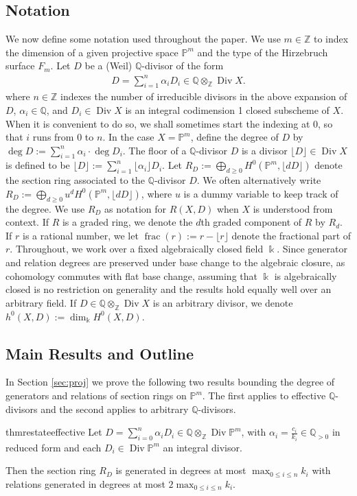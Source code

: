 \documentclass{amsart}
\theoremstyle{plain}
\theoremstyle{definition}
\theoremstyle{remark}
\numberwithin{equation}{subsection}
\newcommand\ssec{\subsection}
\newcommand\bq{{\mathbb Q}}
\newcommand\bp{{\mathbb P}}
\newcommand\bz{{\mathbb Z}}
\newcommand\bk{{\Bbbk}}
\DeclareMathOperator\di{Div}
\newcommand\hirz{F}
\DeclareMathOperator{\fr}{frac}
\begin{document}
\subsection{Notation}
We now define some notation used throughout the paper.
We use $m \in \bz$ to index the dimension of a given projective
space $\bp^m$ and the type of the Hirzebruch surface $\hirz_m$.
Let $D$ be a (Weil) $\bq$-divisor of the form
\begin{align*}
	D = \sum_{i=1}^{n}\alpha_i D_i \in \bq \otimes_\bz \di X.
\end{align*}\noindent
where $n \in \bz$ indexes the number of irreducible divisors in 
the above expansion of $D$, $\alpha_i \in \bq$, and $D_i \in \di X$ is an integral
codimension 1 closed subscheme of $X$. When it is convenient to do
so, we shall sometimes start the indexing at $0$, so that $i$ runs
from $0$ to $n$. In the case $X = \bp^m$, define the degree of $D$ by $\deg D :=
\sum_{i=1}^{n}\alpha_i \cdot \deg D_i$. The floor of a $\bq$-divisor $D$ is a divisor $\lfloor D
\rfloor \in \di X$ is defined to be $\lfloor D \rfloor := \sum_{i = 1}^{n}
\lfloor \alpha_i \rfloor D_i$. Let 
$R_D := \bigoplus_{d \geq 0} H^0(\bp^m, \lfloor dD \rfloor)$
denote the section ring associated to the $\bq$-divisor $D$. 
We often alternatively write
$R_D := \bigoplus_{d \geq 0} u^d H^0(\bp^m, \lfloor dD \rfloor)$, where $u$ is a dummy
variable to keep track of the degree.
We use $R_D$ as notation for $R(X,D)$ when $X$ is understood from context.
If $R$
is a graded ring, we denote the $d$th graded component of $R$ by $R_d$. If $r$ is a rational number, we let
$\fr(r) := r - \lfloor r
\rfloor$ denote the fractional part of $r$. 
Throughout, we work over a fixed algebraically closed field $\bk$.
Since generator and relation degrees are preserved under base change to the algebraic closure, 
as cohomology commutes with flat base change,
assuming that $\bk$ is algebraically closed is no restriction
on generality and the results hold equally well over an arbitrary field.
If $D \in \bq \otimes_\bz
\di X$ is an arbitrary divisor, we denote $h^0(X, D) := \dim_\bk H^0(X,D)$.

\ssec{Main Results and Outline}
\label{ssec:main}

In Section \ref{sec:proj} we prove the following two results bounding
the degree of generators and relations of
section rings on $\bp^m$. The first applies
to effective $\bq$-divisors and the second applies to arbitrary
$\bq$-divisors.
\begin{restatable}{thm}{restateeffective}
\label{thm:proj-effective-intro}
Let $D = \sum_{i = 0}^{n} \alpha_i D_i \in \bq \otimes_\bz \di \bp^m$, with $\alpha_i =
\frac{c_i}{k_i} \in \bq_{> 0}$ in reduced form and each $D_i \in \di \bp^m$ an integral divisor.

Then the section ring $R_D$
is generated in degrees at most $\max_{0 \leq i \leq n}{k_i}$ with
relations generated in degrees at most $2 \max_{0 \leq i \leq n}{k_i}$.
\end{restatable}
\end{document}
